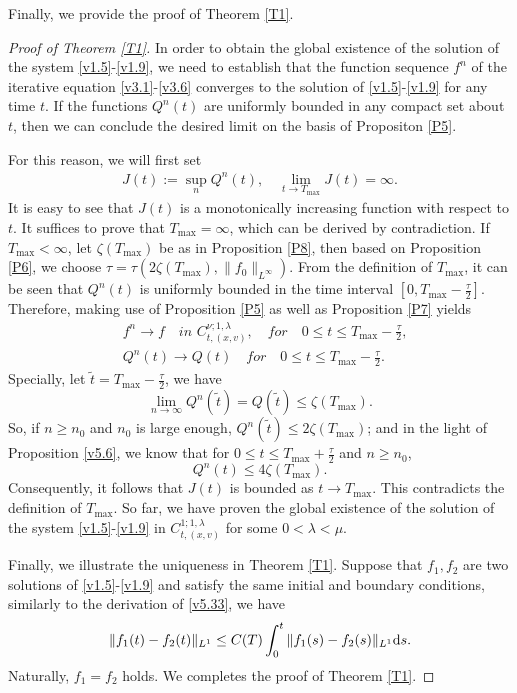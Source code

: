 \documentclass[11pt,reqno]{amsart}%
\theoremstyle{definition}
\theoremstyle{remark}
\begin{document}
Finally, we provide the proof of Theorem \ref{T1}.
\begin{proof}[Proof of Theorem \ref{T1}]
In order to obtain the global existence of the solution of the system \eqref{v1.5}-\eqref{v1.9},   we need to establish that the function sequence $f^{n}$ of the iterative equation \eqref{v3.1}-\eqref{v3.6} converges to the solution of \eqref{v1.5}-\eqref{v1.9} for any time $t$. If the functions $Q^{n}(t)$ are uniformly bounded in any compact set about $t$, then we can conclude the desired limit on the basis of Propositon \ref{P5}.

  For this reason, we will first set %
\begin{align}
J(t):=\sup_{n}Q^{n}(t),\quad \lim_{t\rightarrow T_{\max}}J(t)=\infty. \nonumber
\end{align}
It is easy to see that $J(t)$ is a monotonically increasing function with respect to $t$. It suffices to prove that $T_{\max}=\infty$, which can be derived by contradiction. If $T_{\max} <\infty$,
let $\zeta(T_{\max})$ be as in  Proposition \ref{P8}, then based on  Proposition \ref{P6}, we choose
$\tau=\tau(2\zeta(T_{\max}),\|f_{0}\|_{L^{\infty}})$. From the definition of $T_{\max} $, it can be seen that $Q^{n}(t)$ is uniformly bounded
in the time interval $[0,T_{\max}-\frac{\tau}{2} ]$. Therefore,  making use of Proposition \ref{P5} as well as Proposition \ref{P7} yields
\begin{align}
&f^{n}\rightarrow f \quad  in \,\, C^{\nu;1,\lambda}_{t,(x,v)},  \quad for\quad 0\leq t\leq T_{\max}-\frac{\tau}{2},\nonumber \\
&Q^{n}(t)\rightarrow Q(t) \quad for \quad 0\leq t\leq T_{\max}-\frac{\tau}{2}.\nonumber
\end{align}
Specially, let $\tilde{t}= T_{\max}-\frac{\tau}{2}$, we have
$$\lim_{n\rightarrow \infty}Q^{n}(\tilde{t})=Q(\tilde{t})\leq \zeta(T_{\max}).$$
So, if $n\geq n_{0}$ and $n_{0}$ is large enough, $Q^{n}(\tilde{t})\leq 2\zeta(T_{\max})$;  and   in the light of Proposition \eqref{v5.6}, we know that for
$0\leq t\leq T_{\max}+\frac{\tau}{2}$ and $n\geq n_{0}$,
$$Q^{n}(t)\leq 4\zeta(T_{\max}).$$
Consequently, it follows that $J(t)$ is bounded as $t\rightarrow T_{\max}.$ This contradicts the definition of $T_{\max}.$
So far, we have proven the global existence of the solution of the system \eqref{v1.5}-\eqref{v1.9} in $C^{1;1,\lambda}_{t,(x,v)}$ for some $0<\lambda <\mu.$

Finally, we  illustrate the uniqueness in Theorem \ref{T1}. Suppose that $f_{1},f_{2}$ are two solutions of \eqref{v1.5}-\eqref{v1.9} and satisfy the same initial and boundary conditions, 
similarly to the derivation of \eqref{v5.33}, we have
\begin{align}
\|f_{1}(t)-f_{2}(t)\|_{L^{1}}\leq C(T)\int^{t}_{0}\|f_{1}(s)-f_{2}(s)\|_{L^{1}}{\rm d}s. \nonumber
\end{align}
Naturally,  $f_{1}=f_{2}$ holds. We completes the proof of Theorem \ref{T1}.
\end{proof}
\end{document}

